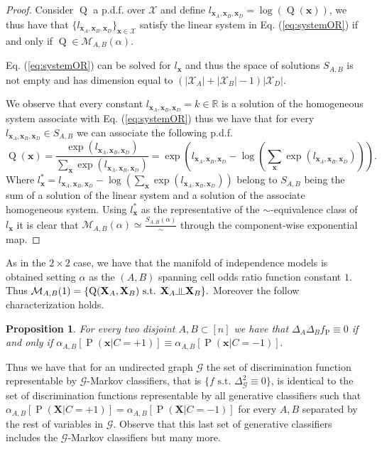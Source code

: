 \documentclass[11pt,a4paper, twoside]{book}
\newtheorem{proposition}{Proposition}[chapter]
\newcommand{\indep}{\rotatebox[origin=c]{90}{$\models$}}
\newcommand{\Pp}{\operatorname{P}}
\newcommand{\Pq}{\operatorname{Q}}
\newcommand{\bX}{\mathbf{X}}
\newcommand{\bchi}{\boldsymbol{\mathcal{X}}}
\begin{document}
\begin{proof}

Consider $\Pq$ a p.d.f. over $\bchi$ and define $l_{\mathbf{x}_A,\mathbf{x}_B,\mathbf{x}_D}= \log( \Pq(\mathbf{x}) )$, we thus have that $\{l_{\mathbf{x}_A,\mathbf{x}_B,\mathbf{x}_D} \}_{\mathbf{x}\in\bchi}$ satisfy the linear system in Eq. (\ref{eq:systemOR}) if and only if $\Pq \in \mathcal{M}_{A,B}(\alpha)$.

Eq. (\ref{eq:systemOR}) can be solved for $l_{\mathbf{x}}$ and thus the space of solutions $S_{A,B}$ is not empty and has dimension equal to $(|\bchi_A| + |\bchi_B| - 1)|\bchi_D|$. 

We observe that every constant $l_{\mathbf{x}_A,\mathbf{x}_B,\mathbf{x}_D}=k \in \mathbb{R}$ is a solution of the homogeneous system associate with Eq. (\ref{eq:systemOR}) thus we have that for every $l_{\mathbf{x}_A,\mathbf{x}_B,\mathbf{x}_D} \in S_{A,B}$ we can associate the following p.d.f. 
$$\Pq(\mathbf{x}) = \frac{\exp(l_{\mathbf{x}_A,\mathbf{x}_B,\mathbf{x}_D})}{\sum_{\mathbf{x}}\exp(l_{\mathbf{x}_A,\mathbf{x}_B,\mathbf{x}_D})}= \exp\left( l_{\mathbf{x}_A,\mathbf{x}_B,\mathbf{x}_D} - \log\left(\sum_{\mathbf{x}}\exp(l_{\mathbf{x}_A,\mathbf{x}_B,\mathbf{x}_D})\right) \right).$$
Where $l^*_{\mathbf{x}} = l_{\mathbf{x}_A,\mathbf{x}_B,\mathbf{x}_D} - \log\left(\sum_{\mathbf{x}}\exp(l_{\mathbf{x}_A,\mathbf{x}_B,\mathbf{x}_D})\right) $ belong to $S_{A,B}$ being the sum of a solution of the linear system and a solution of the associate homogeneous system.
Using $l^*_{\mathbf{x}}$ as the representative  of the $\sim$-equivalence class of $l_{\mathbf{x}}$ it is clear that $\mathcal{M}_{A,B}(\alpha) \simeq \frac{S_{A,B}(\alpha)}{\sim}$ through the component-wise exponential map.
\end{proof}

As in the $2\times 2 $ case, we have that the manifold of independence models is obtained setting $\alpha$ as the $(A,B)$ spanning cell odds ratio function constant $1$.
Thus $\mathcal{M}_{A,B}(1) = \{ \Pq(\bX_A,\bX_B) \text{ s.t. } 	\bX_A \indep \bX_B \} .$
Moreover the follow characterization holds.

\begin{proposition}
For every two disjoint $A,B \subset [n]$ we have that 
$ \Delta_A\Delta_Bf_{\Pp}\equiv 0$ if and only if $ \alpha_{A,B}[\Pp(\mathbf{x}|C=+1)] \equiv \alpha_{A,B}[\Pp(\mathbf{x}|C=-1)].$
\end{proposition}

Thus we have that for an undirected graph $\mathcal{G}$ the set of discrimination function representable  by $\mathcal{G}$-Markov classifiers, that is $\{ f \text{ s.t. } \Delta^2_{\mathcal{G}}\equiv 0 \}$, is identical to the set of discrimination functions representable by all generative classifiers such that $ \alpha_{A,B}[\Pp(\bX|C=+1)] = \alpha_{A,B}[\Pp(\bX|C=-1)]$ for every $A,B$ separated by the rest of variables in $\mathcal{G}$.
Observe that this last set of generative classifiers includes the $\mathcal{G}$-Markov classifiers but many more.
 
\end{document}
